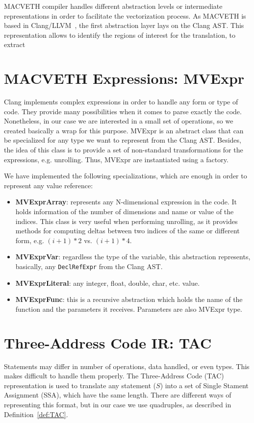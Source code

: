 


MACVETH compiler handles different abstraction levels or intermediate
representations in order to facilitate the vectorization process. As MACVETH is 
based in Clang/LLVM~\cite{bib:clang}, the first abstraction layer lays on the 
Clang AST. This representation allows to identify the regions of interest for 
the translation, to extract 

\section{MACVETH Expressions: MVExpr}
Clang implements complex expressions in order to handle any form or type of
code. They
provide many possibilities
when it comes to parse exactly the code. Nonetheless, in our case we are
interested in a small set of operations, so we created basically a wrap for this
purpose. MVExpr is an abstract class that can be specialized for any type we
want to represent from the Clang AST. Besides, the idea of this class is to
provide a set of non-standard transformations for the expressions, e.g.
unrolling. Thus, MVExpr are instantiated using a factory.

We have implemented the following specializations, which are enough in order to
represent any value reference:

\begin{itemize}
	\item \textbf{MVExprArray}: represents any N-dimensional expression in the
	      code. It
	      holds information of the number of dimensions and name or value of the
	      indices. This class is very useful when performing unrolling, as it 
	      provides methods for computing deltas between two indices of the same 
	      or different form, e.g. $(i+1)*2$ vs. $(i+1)*4$.
	\item \textbf{MVExprVar}: regardless the type of the variable, this
	      abstraction
	      represents, basically, any \texttt{DeclRefExpr} from the Clang AST.
	\item \textbf{MVExprLiteral}: any integer, float, double, char, etc. value.
	\item \textbf{MVExprFunc}: this is a recursive abstraction which holds the
	      name of the function and the parameters it receives. Parameters are 
	      also MVExpr type.
\end{itemize}

\section{Three-Address Code IR: TAC}
Statements may differ in number of operations, data handled, or even types. 
This makes difficult to handle them properly.  The Three-Address Code (TAC) 
representation is used to translate any statement ($S$) into a
set of Single Stament Assignment (SSA), which have the same length. There are 
different ways of representing this format, but in our case we use quadruples, 
as described in Definition~\ref{def:TAC}.

